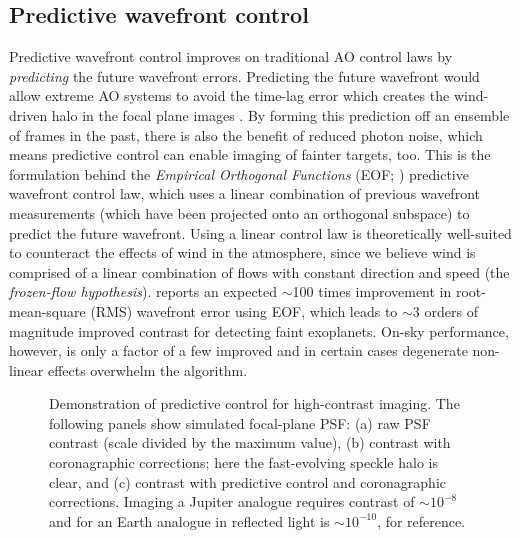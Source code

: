 \subsection{Predictive wavefront control}\label{sec:pwfc}

Predictive wavefront control improves on traditional AO control laws by \textit{predicting} the future wavefront errors. Predicting the future wavefront would allow extreme AO systems to avoid the time-lag error which creates the wind-driven halo in the focal plane images \citep{2018ARA&A..56..315G}. By forming this prediction off an ensemble of frames in the past, there is also the benefit of reduced photon noise, which means predictive control can enable imaging of fainter targets, too. This is the formulation behind the \textit{Empirical Orthogonal Functions} (EOF; \citealp{guyon_adaptive_2017}) predictive wavefront control law, which uses a linear combination of previous wavefront measurements (which have been projected onto an orthogonal subspace) to predict the future wavefront. Using a linear control law is theoretically well-suited to counteract the effects of wind in the atmosphere, since we believe wind is comprised of a linear combination of flows with constant direction and speed (the \textit{frozen-flow hypothesis}). \citet{guyon_adaptive_2017} reports an expected $\sim$100 times improvement in root-mean-square (RMS) wavefront error using EOF, which leads to $\sim$3 orders of magnitude improved contrast for detecting faint exoplanets. On-sky performance, however, is only a factor of a few improved and in certain cases degenerate non-linear effects overwhelm the algorithm.

\begin{figure}
    \centering
    \caption{Demonstration of predictive control for high-contrast imaging. The following panels show simulated focal-plane PSF: (a) raw PSF contrast (scale divided by the maximum value), (b) contrast with coronagraphic corrections; here the fast-evolving speckle halo is clear, and (c) contrast with predictive control and coronagraphic corrections. Imaging a Jupiter analogue requires contrast of $\sim10^{-8}$ and for an Earth analogue in reflected light is $\sim10^{-10}$, for reference.}
    \label{fig:eof-perf}
\end{figure}

